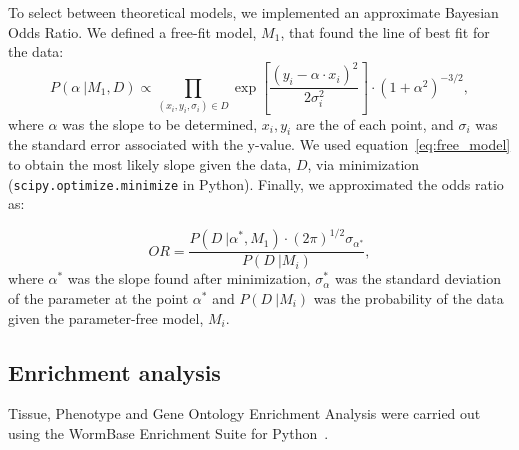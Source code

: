 \documentclass[9pt,twocolumn,twoside]{pnas-new}
\begin{document}
{To select between theoretical models, we implemented an approximate Bayesian
Odds Ratio. We defined a free-fit model, $M_1$, that found the line of best fit
for the data:
\begin{equation}
  P(\alpha~|M_1, D) \propto \prod_{(x_i, y_i, \sigma_i)\in D}
  \exp{
       [\frac{{(y_i - \alpha\cdot x_i)}^2} %
            {2\sigma_i^2}] %
      } \cdot {(1+\alpha^2)}^{-3/2},
  \label{eq:free_model}
\end{equation}
where $\alpha$ was the slope to be determined, $x_i, y_i$ are the
of each point, and $\sigma_i$ was the standard
error associated with the y-value. We used equation~\ref{eq:free_model} to
obtain the most likely slope given the data, $D$, via minimization
(\texttt{scipy.optimize.minimize} in Python). Finally, we approximated the odds
ratio as:

\begin{equation}
  OR = \frac{
  P(D~|\alpha^*, M_1)\cdot {(2\pi)}^{1/2}\sigma_{\alpha^*} %
  }{P(D~| M_i)}, %
\end{equation}
where $\alpha^*$ was the slope found after minimization, $\sigma_\alpha^*$ was the
standard deviation of the parameter at the point $\alpha^*$ and $P(D~|M_i)$ was
the probability of the data given the parameter-free model, $M_i$.

\subsection*{Enrichment analysis}
Tissue, Phenotype and Gene Ontology Enrichment Analysis were carried out using
the WormBase Enrichment Suite for Python~\cite{Angeles-Albores106369,
Angeles-Albores2016}.

} %

\showmatmethods{} %


\showacknow{} %



\end{document}

